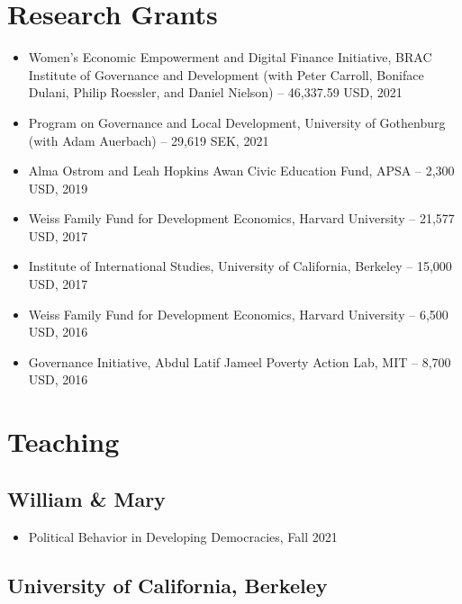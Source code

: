 \documentclass[11pt]{article}
\begin{document}
\section*{Research Grants}
\color{Black}
\begin{itemize}
\item[]Women's Economic Empowerment and Digital Finance Initiative, BRAC Institute of Governance and Development (with Peter Carroll, Boniface Dulani, Philip Roessler, and Daniel Nielson)
 -- 46,337.59 USD, 2021 
\item[] Program on Governance and Local Development, University of Gothenburg (with Adam Auerbach)
-- 29,619 SEK, 2021 
\item[] Alma Ostrom and Leah Hopkins Awan Civic Education Fund, APSA -- 2,300 USD, 2019

\item[] Weiss Family Fund for Development Economics, Harvard University -- 21,577 USD, 2017


	 
\item[]Institute of International Studies, University of California, Berkeley -- 15,000 USD, 2017
\item[] Weiss Family Fund for Development Economics, Harvard University -- 6,500 USD, 2016 

\item[] Governance Initiative, Abdul Latif Jameel Poverty Action Lab, MIT -- 8,700 USD, 2016	
\end{itemize}

\vspace{2mm}


\vspace{2mm}
\color{MidnightBlue}

\section*{Teaching}
\color{Black}
\subsection*{William \& Mary}
\begin{itemize}[nosep]
	\item[]Political Behavior in Developing Democracies, Fall 2021
\end{itemize}
\subsection*{University of California, Berkeley}
\end{document}

